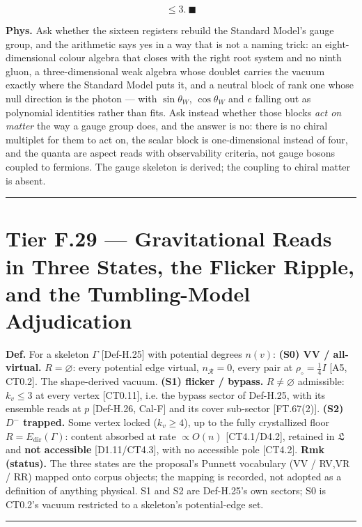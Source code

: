 \begin{theorem}
\[
\le 3.\ \blacksquare
\]

\textbf{Phys.} Ask whether the sixteen registers rebuild the Standard Model's gauge group, and the arithmetic says yes in a way that is not a naming trick: an eight-dimensional colour algebra that closes with the right root system and no ninth gluon, a three-dimensional weak algebra whose doublet carries the vacuum exactly where the Standard Model puts it, and a neutral block of rank one whose null direction is the photon — with $\sin\theta_W$, $\cos\theta_W$ and $e$ falling out as polynomial identities rather than fits. Ask instead whether those blocks \textit{act on matter} the way a gauge group does, and the answer is no: there is no chiral multiplet for them to act on, the scalar block is one-dimensional instead of four, and the quanta are aspect reads with observability criteria, not gauge bosons coupled to fermions. The gauge skeleton is derived; the coupling to chiral matter is absent.

\vspace{2pt}\noindent\rule{\textwidth}{0.4pt}\vspace{2pt}

\end{theorem}

\section[Tier F.29 — Gravitational Reads in Three States, the…]{\texorpdfstring{Tier F.29 — Gravitational Reads in Three States, the Flicker Ripple, and the Tumbling-Model Adjudication}{Tier F.29 - Gravitational Reads in Three States, the Flicker Ripple, and the Tumbling-Model Adjudication}}

\begin{definition}\label{tag:Def-H-30}
\textbf{Def.} For a skeleton $\Gamma$ [Def-H.25] with potential degrees $n(v)$: \textbf{(S0) VV / all-virtual.} $R=\varnothing$: every potential edge virtual, $n_{\mathcal R}=0$, every pair at $\rho_\circ=\tfrac14 I$ [A5, CT0.2]. The shape-derived vacuum. \textbf{(S1) flicker / bypass.} $R\ne\varnothing$ admissible: $k_v\le3$ at every vertex [CT0.11], i.e. the bypass sector of Def-H.25, with its ensemble reads at $p$ [Def-H.26, Cal-F] and its cover sub-sector [FT.67(2)]. \textbf{(S2) $D^-$ trapped.} Some vertex locked ($k_v\ge4$), up to the fully crystallized floor $R=E_{\mathrm{dir}}(\Gamma)$: content absorbed at rate $\propto O(n)$ [CT4.1/D4.2], retained in $\mathfrak L$ and \textbf{not accessible} [D1.11/CT4.3], with no accessible pole [CT4.2]. \textbf{Rmk (status).} The three states are the proposal's Punnett vocabulary (VV / RV,VR / RR) mapped onto corpus objects; the mapping is recorded, not adopted as a definition of anything physical. S1 and S2 are Def-H.25's own sectors; S0 is CT0.2's vacuum restricted to a skeleton's potential-edge set.

\vspace{2pt}\noindent\rule{\textwidth}{0.4pt}\vspace{2pt}

\end{definition}

